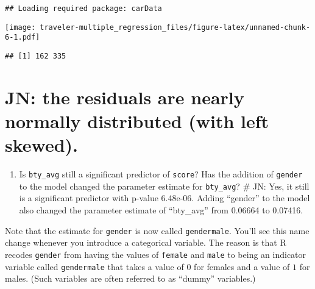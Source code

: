 \documentclass[]{article}
\newenvironment{Shaded}{\begin{snugshade}}{\end{snugshade}}
\newcommand{\KeywordTok}[1]{\textcolor[rgb]{0.13,0.29,0.53}{\textbf{#1}}}
\newcommand{\DataTypeTok}[1]{\textcolor[rgb]{0.13,0.29,0.53}{#1}}
\newcommand{\DecValTok}[1]{\textcolor[rgb]{0.00,0.00,0.81}{#1}}
\newcommand{\StringTok}[1]{\textcolor[rgb]{0.31,0.60,0.02}{#1}}
\newcommand{\OperatorTok}[1]{\textcolor[rgb]{0.81,0.36,0.00}{\textbf{#1}}}
\newcommand{\NormalTok}[1]{#1}
\providecommand{\tightlist}{%
  \setlength{\itemsep}{0pt}\setlength{\parskip}{0pt}}
\begin{document}
\begin{verbatim}
## Loading required package: carData
\end{verbatim}

\begin{Shaded}
\end{Shaded}

\texttt{[image: traveler-multiple\_regression\_files/figure-latex/unnamed-chunk-6-1.pdf]}

\begin{verbatim}
## [1] 162 335
\end{verbatim}

\section{JN: the residuals are nearly normally distributed (with left
skewed).}\label{jn-the-residuals-are-nearly-normally-distributed-with-left-skewed.}

\begin{enumerate}
\def\labelenumi{\arabic{enumi}.}
\setcounter{enumi}{7}
\tightlist
\item
  Is \texttt{bty\_avg} still a significant predictor of \texttt{score}?
  Has the addition of \texttt{gender} to the model changed the parameter
  estimate for \texttt{bty\_avg}? \# JN: Yes, it still is a significant
  predictor with p-value 6.48e-06. Adding ``gender'' to the model also
  changed the parameter estimate of ``bty\_avg'' from 0.06664 to
  0.07416.
\end{enumerate}

Note that the estimate for \texttt{gender} is now called
\texttt{gendermale}. You'll see this name change whenever you introduce
a categorical variable. The reason is that R recodes \texttt{gender}
from having the values of \texttt{female} and \texttt{male} to being an
indicator variable called \texttt{gendermale} that takes a value of
\(0\) for females and a value of \(1\) for males. (Such variables are
often referred to as ``dummy'' variables.)
\end{document}
